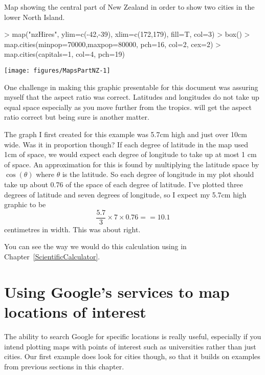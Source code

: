 \begin{exhibit} 
\caption{Map showing the central part of New Zealand in order to show two cities in the lower North Island.} 
\label{PartNZ} 
\begin{center} 

\begin{Schunk}
\begin{Sinput}
> map("nzHires", ylim=c(-42,-39), xlim=c(172,179), fill=T, col=3) 
> box() 
> map.cities(minpop=70000,maxpop=80000, pch=16, col=2, cex=2) 
> map.cities(capitals=1, col=4, pch=19) 
\end{Sinput}

\texttt{[image: figures/MapsPartNZ-1]} \end{Schunk}

\end{center} 
\end{exhibit} 
 
One challenge in making this graphic presentable for this document  
was assuring myself that the aspect ratio was correct. Latitudes and longitudes do not take up equal space especially as you move further from the tropics. \R{} will get the aspect ratio correct but being sure is another matter.  
 
The graph I first created for this example was 5.7cm high and just over 10cm wide. Was it in proportion though? If each degree of latitude in the map used 1cm of space, we would expect each degree of longitude to take up at most 1 cm of space. An approximation for this is found by multiplying the latitude space by $\cos(\theta)$ where $\theta$ is the latitude. So each degree of longitude in my plot should take up about 0.76 of the space of each degree of latitude. I've plotted three degrees of latitude and seven degrees of longitude, so I expect my 5.7cm high graphic to be  
$$ \frac{5.7}{3} \times 7 \times 0.76 == 10.1 $$ 
centimetres in width. This was about right.  
 
You can see the way we would do this calculation using \R{} in Chapter~\ref{ScientificCalculator}. 
 
 
\section{Using Google's services to map locations of interest} 
 
The ability to search Google for specific locations is really useful, especially if you intend plotting maps with points of interest such as universities rather than just cities. Our first example does look for cities though, so that it builds on examples from previous sections in this chapter. 
 

